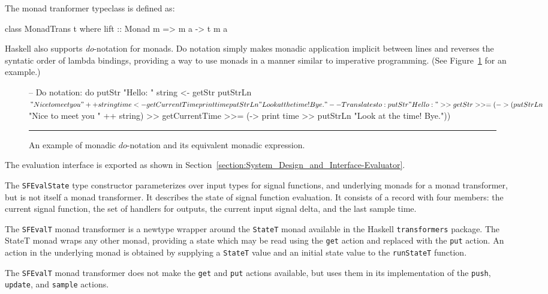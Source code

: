 \documentclass[draft]{llncs}
\begin{document}
The monad tranformer typeclass is defined as:

\begin{code}
class MonadTrans t where
  lift :: Monad m => m a -> t m a
\end{code}

Haskell also supports {\em do}-notation for monads. Do notation simply
makes monadic application implicit between lines and reverses the syntatic
order of lambda bindings, providing a way to use monads in a manner similar
to imperative programming. (See Figure~\ref{figure:monad-example} for an
example.)

\begin{figure}
\begin{code}
-- Do notation:
do putStr "Hello: "
   string <- getStr
   putStrLn $ "Nice to meet you " ++ string
   time <- getCurrentTime
   print time
   putStrLn "Look at the time! Bye."

-- Translates to:
putStr "Hello: " >> getStr >>= 
(\string -> (putStrLn $ "Nice to meet you " ++ string) >>
 getCurrentTime >>=
 (\time -> print time >> putStrLn "Look at the time! Bye."))
\end{code}
\hrule
\caption{An example of monadic $do$-notation and its equivalent monadic
expression.}
\label{figure:monad-example}
\end{figure}

The evaluation interface is exported as shown in
Section~\ref{section:System_Design_and_Interface-Evaluator}.

The {\tt SFEvalState} type constructor parameterizes over input types for signal
functions, and underlying monads for a monad transformer, but is not itself
a monad transformer. It describes the state of signal function evaluation.
It consists of a record with four members: the current signal function,
the set of handlers for outputs, the current input signal delta, and the last
sample time.

The {\tt SFEvalT} monad transformer is a newtype wrapper around the {\tt StateT}
monad available in the Haskell {\tt transformers} package. The StateT monad
wraps any other monad, providing a state which may be read using the {\tt get}
action and replaced with the {\tt put} action. An action in the underlying
monad is obtained by supplying a {\tt StateT} value and an initial state
value to the {\tt runStateT} function.

The {\tt SFEvalT} monad transformer does not make the {\tt get} and {\tt put}
actions available, but uses them in its implementation of the {\tt push},
{\tt update}, and {\tt sample} actions.
\end{document}
